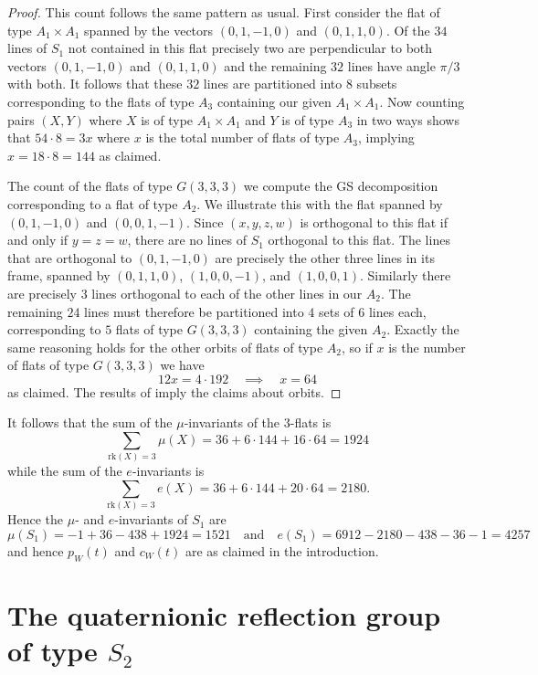 \documentclass[11pt, reqno]{amsart}
\numberwithin{equation}{section}
\theoremstyle{definition}
\theoremstyle{plain}
\begin{document}
\begin{proof}
This count follows the same pattern as usual. First consider the flat of type $A_1 \times A_1$ spanned by the vectors $(0,1,-1,0)$ and $(0,1,1,0)$. Of the $34$ lines of $S_1$ not contained in this flat precisely two are perpendicular to both vectors $(0,1,-1,0)$ and $(0,1,1,0)$ and the remaining $32$ lines have angle $\pi/3$ with both. It follows that these $32$ lines are partitioned into $8$ subsets corresponding to the flats of type $A_3$ containing our given $A_1 \times A_1$. Now counting pairs $(X,Y)$ where $X$ is of type $A_1 \times A_1$ and $Y$ is of type $A_3$ in two ways shows that $54 \cdot 8=3x$ where $x$ is the total number of flats of type $A_3$, implying $x=18 \cdot 8=144$ as claimed. 

The count of the flats of type $G(3,3,3)$ we compute the GS decomposition corresponding to a flat of type $A_2$. We illustrate this with the flat spanned by $(0,1,-1,0)$ and $(0,0,1,-1)$. Since $(x,y,z,w)$ is orthogonal to this flat if and only if $y=z=w$, there are no lines of $S_1$ orthogonal to this flat. The lines that are orthogonal to $(0,1,-1,0)$ are precisely the other three lines in its frame, spanned by $(0,1,1,0)$, $(1,0,0,-1)$, and $(1,0,0,1)$. Similarly there are precisely $3$ lines orthogonal to each of the other lines in our $A_2$. The remaining $24$ lines must therefore be partitioned into $4$ sets of $6$ lines each, corresponding to $5$ flats of type $G(3,3,3)$ containing the given $A_2$. Exactly the same reasoning holds for the other orbits of flats of type $A_2$, so if $x$ is the number of flats of type $G(3,3,3)$ we have
$$12x=4\cdot 192 \quad \implies \quad x=64$$ as claimed. The results of \cite{BST} imply the claims about orbits.
\end{proof}

It follows that the sum of the $\mu$-invariants of the $3$-flats is
$$\sum_{\mathrm{rk}(X)=3} \mu(X)=36+6\cdot144+16 \cdot 64=1924$$ while the sum of the $e$-invariants is
$$\sum_{\mathrm{rk}(X)=3} e(X)=36+6 \cdot 144+20 \cdot 64=2180.$$ Hence the $\mu$- and $e$-invariants of $S_1$ are
$$\mu(S_1)=-1+36-438+1924=1521 \quad \text{and} \quad e(S_1)=6912-2180-438-36-1=4257$$ and hence $p_W(t)$ and $c_W(t)$ are as claimed in the introduction.

\section{The quaternionic reflection group of type $S_2$} 
\end{document}
